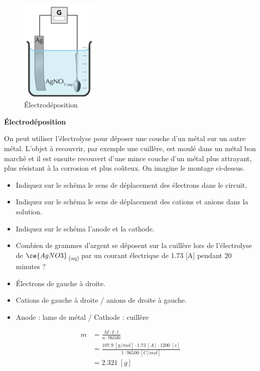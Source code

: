 \documentclass[
  11pt,
  a4paper,
  openany]{book}
\providecommand{\tightlist}{%
  \setlength{\itemsep}{0pt}\setlength{\parskip}{0pt}}
\begin{document}
\clearpage

\begin{figure}
\centering
\includegraphics[width=10em,height=\textheight]{images/electrolysis-spoon.png}
\caption{Électrodéposition}
\end{figure}

\begin{Exercise}

\textbf{Électrodéposition}

On peut utiliser l'électrolyse pour déposer une couche d'un métal sur un autre métal. L'objet à recouvrir, par exemple une cuillère, est moulé dans un métal bon marché et il est ensuite recouvert d'une mince couche d'un métal plus attrayant, plus résistant à la corrosion et plus coûteux. On imagine le montage ci-dessus.

\begin{itemize}
\tightlist
\item
  Indiquez sur le schéma le sens de déplacement des électrons dans le circuit.
\item
  Indiquez sur le schéma le sens de déplacement des cations et anions dans la solution.
\item
  Indiquez sur le schéma l'anode et la cathode.
\item
  Combien de grammes d'argent se déposent sur la cuillère lors de l'électrolyse de \(\ce{AgNO3}\)\textsubscript{(aq)} par un courant électrique de 1.73 {[}A{]} pendant 20 minutes ?
\end{itemize}


\end{Exercise}

\begin{Answer}

\begin{itemize}
\tightlist
\item
  Électrons de gauche à droite.
\item
  Cations de gauche à droite / anions de droite à gauche.
\item
  Anode : lame de métal / Cathode : cuillère
\end{itemize}

\[
\begin{split}
  m &= \frac{M \cdot I \cdot t}{n \cdot 96500} \\
  &= \frac{107.9\ [g/mol] \cdot 1.73\ [A] \cdot 1200\ [s]}{1 \cdot 96500\ [C/mol]} \\
  &= 2.321\ [g]
\end{split}
\]

\end{Answer}
\end{document}
